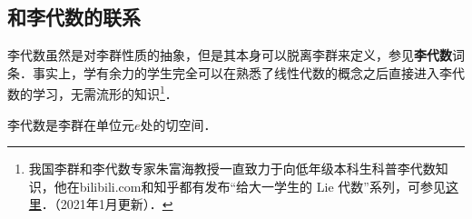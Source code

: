 \subsection{和李代数的联系}

李代数虽然是对李群性质的抽象，但是其本身可以脱离李群来定义，参见\textbf{李代数}词条．事实上，学有余力的学生完全可以在熟悉了线性代数的概念之后直接进入李代数的学习，无需流形的知识\footnote{我国李群和李代数专家朱富海教授一直致力于向低年级本科生科普李代数知识，他在bilibili.com和知乎都有发布“给大一学生的 Lie 代数”系列，可参见\href{https://space.bilibili.com/509086270?from=search&seid=2394735306274350134和https://zhuanlan.zhihu.com/p/161735986}{这里}．（2021年1月更新）．}．

李代数是李群在单位元$e$处的切空间．




